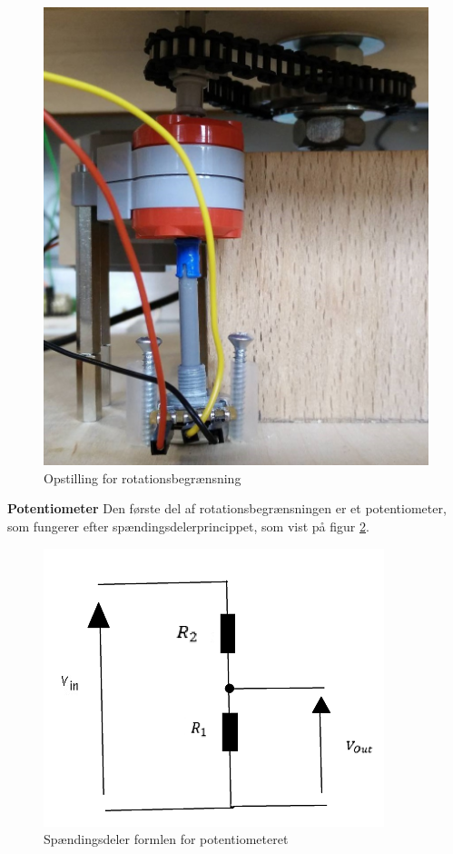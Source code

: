 \begin{figure}[H]
	\centering
	\includegraphics[scale=0.3]{Afsnit/DesignOgImplementering/images/potentiometerADC}
	\caption{Opstilling for rotationsbegrænsning}
	\label{fig:opstillingADC}
\end{figure}

\noindent \textbf{Potentiometer} \newline
\noindent Den første del af rotationsbegrænsningen er et potentiometer, som fungerer efter spændingsdelerprincippet, som vist på figur \ref{fig:potentiometer2}.

\begin{figure}[H]
	\centering
	\includegraphics[scale=0.65]{DesignOgImplementering/images/potentiometer}
	\caption{Spændingsdeler formlen for potentiometeret}
	\label{fig:potentiometer2}
	
\end{figure}

